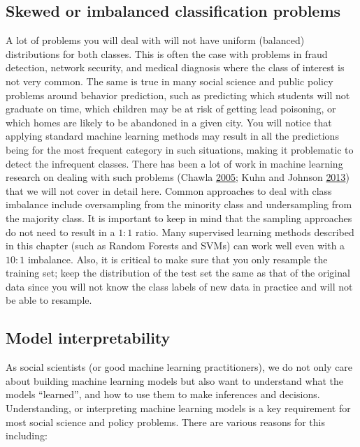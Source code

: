 \documentclass[]{krantz}
\begin{document}
\subsection{Skewed or imbalanced classification
problems}\label{skewed-or-imbalanced-classification-problems}

A lot of problems you will deal with will not have uniform (balanced)
distributions for both classes. This is often the case with problems in
fraud detection, network security, and medical diagnosis where the class
of interest is not very common. The same is true in many social science
and public policy problems around behavior prediction, such as
predicting which students will not graduate on time, which children may
be at risk of getting lead poisoning, or which homes are likely to be
abandoned in a given city. You will notice that applying standard
machine learning methods may result in all the predictions being for the
most frequent category in such situations, making it problematic to
detect the infrequent classes. There has been a lot of work in machine
learning research on dealing with such problems (Chawla
\protect\hyperlink{ref-Chawla05}{2005}; Kuhn and Johnson
\protect\hyperlink{ref-KuhnJohnson2013}{2013}) that we will not cover in
detail here. Common approaches to deal with class imbalance include
oversampling from the minority class and undersampling from the majority
class. It is important to keep in mind that the sampling approaches do
not need to result in a \(1:1\) ratio. Many supervised learning methods
described in this chapter (such as Random Forests and SVMs) can work
well even with a \(10:1\) imbalance. Also, it is critical to make sure
that you only resample the training set; keep the distribution of the
test set the same as that of the original data since you will not know
the class labels of new data in practice and will not be able to
resample.

\subsection{Model interpretability}\label{model-interpretability}

As social scientists (or good machine learning practitioners), we do not
only care about building machine learning models but also want to
understand what the models ``learned'', and how to use them to make
inferences and decisions. Understanding, or interpreting machine
learning models is a key requirement for most social science and policy
problems. There are various reasons for this including:
\end{document}
